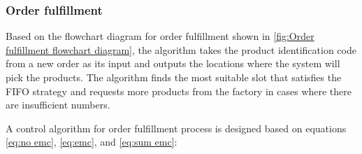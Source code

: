 \subsubsection{Order fulfillment}\label{ca:order fulfillment}

Based on the flowchart diagram for order fulfillment shown in \autoref{fig:Order fulfillment flowchart diagram}, the algorithm takes the product identification code from a new order as its input and outputs the locations where the system will pick the products. The algorithm finds the most suitable slot that satisfies the FIFO strategy and requests more products from the factory in cases where there are insufficient numbers.

A control algorithm for order fulfillment process is designed based on equations \eqref{eq:no emc}, \eqref{eq:emc}, and \eqref{eq:sum emc}:
